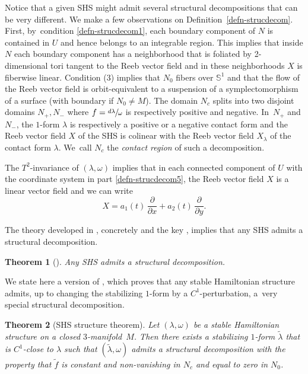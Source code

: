 \documentclass[JEP,XML,SOM,Unicode,NoEqCountersInSection,NoFloatCountersInSection,published]{cedram}
\newcommand{\threemanifold}{$3$\nobreakdash-mani\-fold\xspace}
\newtheorem{theorem}{Theorem}[section]
\theoremstyle{definition}
\begin{document}
Notice that a given SHS might admit several structural decompositions that can be very different.
We make a few observations on Definition~\ref{defn-strucdecom}. First, by~condition \eqref{defn-strucdecom1}, each boundary component of $N$ is contained in $U$ and hence belongs to an integrable region. This implies that inside $N$ each boundary component has a neighborhood that is foliated by 2-dimensional tori tangent to the Reeb vector field and in these neighborhoods $X$ is fiberwise linear. Condition (3) implies that $N_0$ fibers over $\mathbb{S}^1$ and that the flow of the Reeb vector field is orbit-equivalent to a suspension of a symplectomorphism of a surface (with boundary if $N_0\neq M$). The domain $N_c$ splits into two disjoint domains $N_+, N_-$ where $f=\sfrac{d\lambda}{\omega}$ is respectively positive and negative. In~$N_+$ and $N_-$, the $1$-form $\lambda$ is respectively a positive or a negative contact form and the Reeb vector field $X$ of the SHS is colinear with the Reeb vector field $X_\lambda$ of the contact form $\lambda$. We~call $N_c$ the \emph{contact region} of such a decomposition.

The $T^2$-invariance of $(\lambda, \omega)$ implies that in each connected component of $U$ with the coordinate system in part \eqref{defn-strucdecom5},
the Reeb vector field $X$ is a linear vector field and we can write
\begin{equation}\label{eq-Xonregular}
X=a_1(t)\,\frac{\partial}{\partial x}+a_2(t)\,\frac{\partial}{\partial y}.
\end{equation}

The theory developed in \cite{CV1}, concretely \cite[Th.\,3.3]{CV1} and the key \cite[Prop.\,3.23]{CV1}, implies that any SHS admits a structural decomposition.
\begin{theorem}[\cite{CV1}]
Any SHS admits a structural decomposition.
\end{theorem}
We state here a version of \cite[Th.\,4.1]{CV1}, which proves that any stable Hamiltonian structure admits, up to changing the stabilizing $1$-form by a $C^1$-perturbation, a~very special structural decomposition.
\begin{theorem}[SHS structure theorem]\label{thm:struc}
Let $(\lambda,\omega)$ be a stable Hamiltonian structure on a closed \threemanifold~$M$. Then there exists a stabilizing $1$-form $\widetilde \lambda$ that is $C^1$-close to $\lambda$ such that $(\widetilde \lambda, \omega)$ admits a structural decomposition with the property that $\widetilde f$ is constant and non-vanishing in $N_c$ and equal to zero in $N_0$.
\end{theorem}
\end{document}
